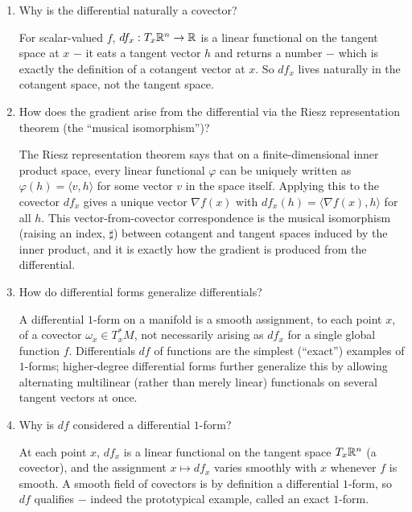 \documentclass{self-check}
\begin{document}
\begin{enumerate}[resume, leftmargin=*, itemsep=8pt]
\item Why is the differential naturally a covector?
\begin{answer}
For scalar-valued \(f\), \(df_x:T_x\mathbb{R}^n\to\mathbb{R}\) is a linear functional on the tangent space at \(x\) \(-\) it eats a tangent vector \(h\) and returns a number \(-\) which is exactly the definition of a cotangent vector at \(x\). So \(df_x\) lives naturally in the cotangent space, not the tangent space.
\end{answer}

\item How does the gradient arise from the differential via the Riesz representation theorem (the ``musical isomorphism'')?
\begin{answer}
The Riesz representation theorem says that on a finite-dimensional inner product space, every linear functional \(\varphi\) can be uniquely written as \(\varphi(h)=\langle v,h\rangle\) for some vector \(v\) in the space itself. Applying this to the covector \(df_x\) gives a unique vector \(\nabla f(x)\) with \(df_x(h)=\langle\nabla f(x),h\rangle\) for all \(h\). This vector-from-covector correspondence is the musical isomorphism (raising an index, \(\sharp\)) between cotangent and tangent spaces induced by the inner product, and it is exactly how the gradient is produced from the differential.
\end{answer}

\item How do differential forms generalize differentials?
\begin{answer}
A differential \(1\)-form on a manifold is a smooth assignment, to each point \(x\), of a covector \(\omega_x\in T_x^*M\), not necessarily arising as \(df_x\) for a single global function \(f\). Differentials \(df\) of functions are the simplest (``exact'') examples of \(1\)-forms; higher-degree differential forms further generalize this by allowing alternating multilinear (rather than merely linear) functionals on several tangent vectors at once.
\end{answer}

\item Why is \(df\) considered a differential \(1\)-form?
\begin{answer}
At each point \(x\), \(df_x\) is a linear functional on the tangent space \(T_x\mathbb{R}^n\) (a covector), and the assignment \(x\mapsto df_x\) varies smoothly with \(x\) whenever \(f\) is smooth. A smooth field of covectors is by definition a differential \(1\)-form, so \(df\) qualifies \(-\) indeed the prototypical example, called an exact \(1\)-form.
\end{answer}


\end{enumerate}
\end{document}
